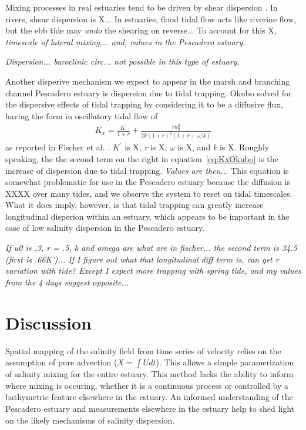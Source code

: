 Mixing processes in real estuaries tend to be driven by shear dispersion \parencite{fischer_mixing_1979}. In rivers, shear dispersion is X... In estuaries, flood tidal flow acts like riverine flow, but the ebb tide may
\emph{undo} the shearing on reverse... To account for this X, \emph{timescale of lateral mixing},... \emph{and, values in the Pescadero estuary}. 

\emph{Dispersion... baroclinic circ... not possible in this type of estuary.}

Another disperive mechanism we expect to appear in the marsh and branching channel Pescadero estuary is dispersion due to tidal trapping. Okubo \parencite*{okubo_effect_1973} solved for the dispersive effects of tidal trapping by considering it to be a diffusive flux, having the form in oscillatory tidal flow of
\begin{eqnarray}
K_x = \frac{K^{'}}{1+r} + \frac{ru_0^2}{2k(1+r)^2(1+r+\omega / k)} \label{eq:KxOkubo}
\end{eqnarray}
as reported in Fischer et al. \parencite*{fischer_mixing_1979}. $K^'$ is X, \emph{r} is X, $\omega$ is X, and \emph{k} is X. Roughly speaking, the the second term on the right in equation~\ref{eq:KxOkubo} is the increase of dispersion due to tidal trapping. \emph{Values are then...} 
This equation is somewhat problematic for use in the Pescadero estuary because the diffusion is XXXX over many tides, and we observe the system to reset on tidal timescales. What it does imply, however, is that tidal trapping can greatly increase longitudinal disperion within an estuary, which appears to be important in the case of low salinity dispersion in the Pescadero estuary.

\emph{If u0 is .3, r = .5, k and omega are what are in fischer... the second term is 34.5 (first is .66K')... If I figure out what that longitudinal diff term is, can get r variation with tide? Except I expect more trapping with spring tide, and my values from the 4 days suggest opposite...}

\section{Discussion} \label{sec:discCh4}

Spatial mapping of the salinity field from time series of velocity relies on the assumption of pure advection ($X = \int{U}dt$). This allows a simple paramerization of salinity mixing for the entire estuary. This method lacks the ability to inform where mixing is occuring, whether it is a continuous process or controlled by a bathymetric feature elsewhere in the estuary. An informed understanding of the Pescadero estuary and measurements elsewhere in the estuary help to shed light on the likely mechanisms of salinity dispersion.

